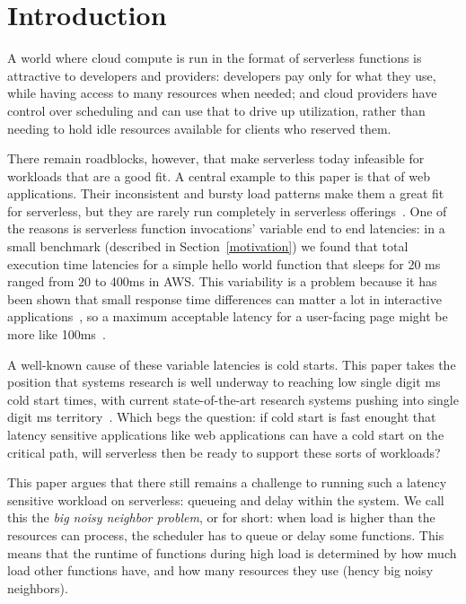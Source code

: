 \section{Introduction}

A world where cloud compute is run in the format of serverless functions is
attractive to developers and providers: developers pay only for what they use,
while having access to many resources when needed; and cloud providers have
control over scheduling and can use that to drive up utilization, rather than
needing to hold idle resources available for clients who reserved them.


There remain roadblocks, however, that make serverless today infeasible for
workloads that are a good fit. A central example to this paper is that of web
applications. Their inconsistent and bursty load patterns make them a great fit
for serverless, but they are rarely run completely in serverless
offerings~\cite{reddit-serverless1, reddit-serverless2, not-lambda-blog}. One of
the reasons is serverless function invocations' variable end to end latencies:
in a small benchmark (described in Section~\ref{motivation}) we found that total
execution time latencies for a simple hello world function that sleeps for 20 ms
ranged from 20 to 400ms in AWS. This variability is a problem because it has
been shown that small response time differences can matter a lot in interactive
applications~\cite{amz-page-load,google-page-load}, so a maximum acceptable
latency for a user-facing page might be more like 100ms~\cite{page-load-time}.


A well-known cause of these variable latencies is cold starts. This paper takes
the position that systems research is well underway to reaching low single digit
ms cold start times, with current state-of-the-art research systems pushing into
single digit ms territory~\cite{sigmaos,mitosis}. Which begs the question: if
cold start is fast enought that latency sensitive applications like web
applications can have a cold start on the critical path, will serverless then be
ready to support these sorts of workloads?

This paper argues that there still remains a challenge to running such a latency
sensitive workload on serverless: queueing and delay within the system. We call
this the \emph{big noisy neighbor problem}, or \problem{} for short: when load
is higher than the resources can process, the scheduler has to queue or delay
some functions. This means that the runtime of functions during high load is
determined by how much load other functions have, and how many resources they
use (hency big noisy neighbors).



